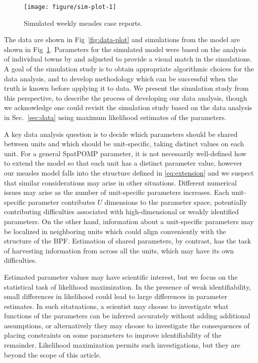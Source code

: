 \documentclass[12pt]{article}\usepackage[]{graphicx}\usepackage[]{xcolor}
\newenvironment{knitrout}{}{} %
\begin{document}
\begin{knitrout}
\color{fgcolor}\begin{figure}

\texttt{[image: figure/sim-plot-1]} \hfill{}

\caption[Simulated weekly measles case reports]{Simulated weekly measles case reports.}\label{fig:sim-plot}
\end{figure}

\end{knitrout}

The data are shown in Fig~\ref{fig:data-plot} and simulations from the model are shown in Fig~\ref{fig:sim-plot}.
Parameters for the simulated model were based on the analysis of individual towns by \citet{he10} and adjusted to provide a visual match in the simulations.
A goal of the simulation study is to obtain appropriate algorithmic choices for the data analysis, and to develop methodology which can be successful when the truth is known before applying it to data.
We present the simulation study from this perspective, to describe the process of developing our data analysis, though we acknowledge one could revisit the simulation study based on the data analysis in Sec.~\ref{sec:data} using maximum likelihood estimates of the parameters.

A key data analysis question is to decide which parameters should be shared between units and which should be unit-specific, taking distinct values on each unit.
For a general SpatPOMP parameter, it is not necessarily well-defined how to extend the model so that each unit has a distinct parameter value, however our measles model falls into the structure defined in \eqref{eq:extension} and we suspect that similar considerations may arise in other situations.
Different numerical issues may arise as the number of unit-specific parameters increases.
Each unit-specific parameter contributes $U$ dimensions to the parameter space, potentially contributing difficulties associated with high-dimensional or weakly identified parameters.
On the other hand, information about a unit-specific parameters may be localized in neighboring units which could align conveniently with the structure of the BPF.
Estimation of shared parameters, by contrast, has the task of harvesting information from across all the units, which may have its own difficulties.

Estimated parameter values may have scientific interest, but we focus on the statistical task of likelihood maximization.
In the presence of weak identifiability, small differences in likelihood could lead to large differences in parameter estimates.
In such sitatuations, a scientist may choose to investigate what functions of the parameters can be inferred accurately without adding additional assumptions, or alternatively they may choose to investigate the consequences of placing constraints on some parameters to improve identifiability of the remainder.
Likelihood maximization permits such investigations, but they are beyond the scope of this article.
\end{document}
